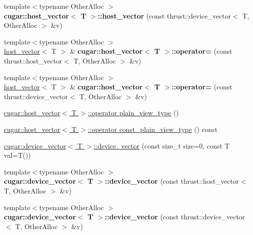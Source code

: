 \begin{DoxyCompactItemize}
\item 
\mbox{\label{group___basic_ga2cef1312f8c45764905f037c035cdbb2}} 
{\footnotesize template$<$typename Other\+Alloc $>$ }\\{\bfseries cugar\+::host\+\_\+vector$<$ T $>$\+::host\+\_\+vector} (const thrust\+::device\+\_\+vector$<$ T, Other\+Alloc $>$ \&v)
\item 
\mbox{\label{group___basic_ga161776a80d5151ded660603abb162083}} 
{\footnotesize template$<$typename Other\+Alloc $>$ }\\\hyperlink{structcugar_1_1host__vector}{host\+\_\+vector}$<$ T $>$ \& {\bfseries cugar\+::host\+\_\+vector$<$ T $>$\+::operator=} (const thrust\+::host\+\_\+vector$<$ T, Other\+Alloc $>$ \&v)
\item 
\mbox{\label{group___basic_gafe694ffc0fac8ac40812a6af5617a1a1}} 
{\footnotesize template$<$typename Other\+Alloc $>$ }\\\hyperlink{structcugar_1_1host__vector}{host\+\_\+vector}$<$ T $>$ \& {\bfseries cugar\+::host\+\_\+vector$<$ T $>$\+::operator=} (const thrust\+::device\+\_\+vector$<$ T, Other\+Alloc $>$ \&v)
\item 
\hyperlink{group___basic_gafa4904073d10ce73dc33dfb69013b501}{cugar\+::host\+\_\+vector$<$ T $>$\+::operator plain\+\_\+view\+\_\+type} ()
\item 
\hyperlink{group___basic_ga4b49363d011f3360acad5d64fad398cb}{cugar\+::host\+\_\+vector$<$ T $>$\+::operator const\+\_\+plain\+\_\+view\+\_\+type} () const
\item 
\hyperlink{group___basic_ga9a8d64513864f07fe5e576a13980fafe}{cugar\+::device\+\_\+vector$<$ T $>$\+::device\+\_\+vector} (const size\+\_\+t size=0, const T val=T())
\item 
\mbox{\label{group___basic_ga7e68acf39ba22542683af8b84aaeab7b}} 
{\footnotesize template$<$typename Other\+Alloc $>$ }\\{\bfseries cugar\+::device\+\_\+vector$<$ T $>$\+::device\+\_\+vector} (const thrust\+::host\+\_\+vector$<$ T, Other\+Alloc $>$ \&v)
\item 
\mbox{\label{group___basic_ga62f4eeed9c038da56679a32ffbe29cfd}} 
{\footnotesize template$<$typename Other\+Alloc $>$ }\\{\bfseries cugar\+::device\+\_\+vector$<$ T $>$\+::device\+\_\+vector} (const thrust\+::device\+\_\+vector$<$ T, Other\+Alloc $>$ \&v)

\end{DoxyCompactItemize}

